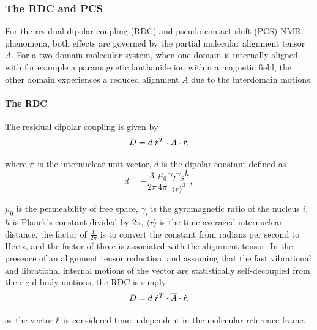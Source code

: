 
\subsubsection{The RDC and PCS}

For the residual dipolar coupling (RDC) and pseudo-contact shift (PCS) NMR phenomena, both effects are governed by the partial molecular alignment tensor $A$.
For a two domain molecular system, when one domain is internally aligned with for example a paramagnetic lanthanide ion within a magnetic field, the other domain experiences a reduced alignment $\overline{A}$ due to the interdomain motions.


\paragraph{The RDC}

The residual dipolar coupling is given by
\begin{equation} \label{eq: RDC equation}
    D = d \; \hat{r}^T \cdot A \cdot \hat{r} ,
\end{equation}

where $\hat{r}$ is the internuclear unit vector, $d$ is the dipolar constant defined as
\begin{equation} \label{eq: RDC dipolar constant}
    d = - \frac{3}{2\pi} \frac{\mu_0}{4\pi} \frac{\gamma_I \gamma_S \hbar}{\langle r \rangle^3} ,
\end{equation}

$\mu_0$ is the permeability of free space, $\gamma_i$ is the gyromagnetic ratio of the nucleus $i$, $\hbar$ is Planck's constant divided by $2\pi$, $\langle r \rangle$ is the time averaged internuclear distance, the factor of $\tfrac{1}{2\pi}$ is to convert the constant from radians per second to Hertz, and the factor of three is associated with the alignment tensor.
In the presence of an alignment tensor reduction, and assuming that the fast vibrational and librational internal motions of the vector are statistically self-decoupled from the rigid body motions, the RDC is simply
\begin{equation} \label{eq: reduced RDC equation}
    D = d \; \hat{r}^T \cdot \overline{A} \cdot \hat{r} ,
\end{equation}

as the vector $\hat{r}$ is considered time independent in the molecular reference frame.


